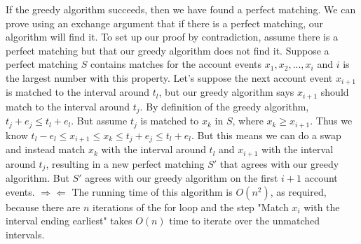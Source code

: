 \documentclass[11pt]{article}
\begin{document}
If the greedy algorithm succeeds, then we have found a perfect matching. We can prove using an exchange argument that if there is a perfect matching, our algorithm will find it. To set up our proof by contradiction, assume there is a perfect matching but that our greedy algorithm does not find it. Suppose a perfect matching $S$ contains matches for the account events $x_1, x_2, ..., x_i$ and $i$ is the largest number with this property. Let's suppose the next account event $x_{i + 1}$ is matched to the interval around $t_l$, but our greedy algorithm says $x_{i + 1}$ should match to the interval around $t_j$. By definition of the greedy algorithm, $t_j + e_j \leq t_l + e_l$. But assume $t_j$ is matched to $x_k$ in $S$, where $x_k \geq x_{i + 1}$. Thus we know $t_l - e_l \leq x_{i + 1} \leq x_k \leq t_j + e_j \leq t_l + e_l$. But this means we can do a swap and instead match $x_k$ with the interval around $t_l$ and $x_{i + 1}$ with the interval around $t_j$, resulting in a new perfect matching $S'$ that agrees with our greedy algorithm. But $S'$ agrees with our greedy algorithm on the first $i + 1$ account events. $\Rightarrow \Leftarrow$ The running time of this algorithm is $O(n^2)$, as required, because there are $n$ iterations of the for loop and the step "Match $x_i$ with the interval ending earliest" takes $O(n)$ time to iterate over the unmatched intervals.

\clearpage
\end{document}
